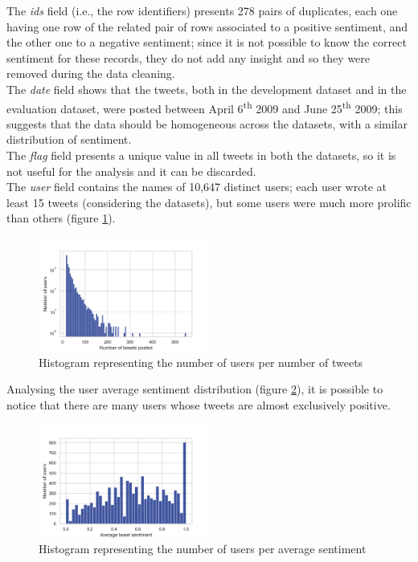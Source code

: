 \documentclass[conference]{IEEEtran}
\begin{document}
The \textit{ids} field (i.e., the row identifiers) presents 278 pairs of duplicates, each one having one row of the related pair of rows associated to a positive sentiment, and the other one to a negative sentiment; since it is not possible to know the correct sentiment for these records, they do not add any insight and so they were removed during the data cleaning. \\
The \textit{date} field shows that the tweets, both in the development dataset and in the evaluation dataset, were posted between April 6\textsuperscript{th} 2009 and June 25\textsuperscript{th} 2009; this suggests that the data should be homogeneous across the datasets, with a similar distribution of sentiment. \\
The \textit{flag} field presents a unique value in all tweets in both the datasets, so it is not useful for the analysis and it can be discarded. \\
The \textit{user} field contains the names of 10,647 distinct users; each user wrote at least 15 tweets (considering the datasets), but some users were much more prolific than others (figure \ref{fig:user_per_tweet}).
\begin{figure}
    \includegraphics[width=0.5\textwidth]{user_per_tweet}
    \caption[Histogram of users per tweets]{Histogram representing the number of users per number of tweets}
    \label{fig:user_per_tweet}
\end{figure}
Analysing the user average sentiment distribution (figure \ref{fig:average_user_sentiment}), it is possible to notice that there are many users whose tweets are almost exclusively positive.
\begin{figure}
    \includegraphics[width=0.5\textwidth]{average_user_sentiment}
    \caption[User average sentiment]{Histogram representing the number of users per average sentiment}
    \label{fig:average_user_sentiment}
\end{figure}
\end{document}
